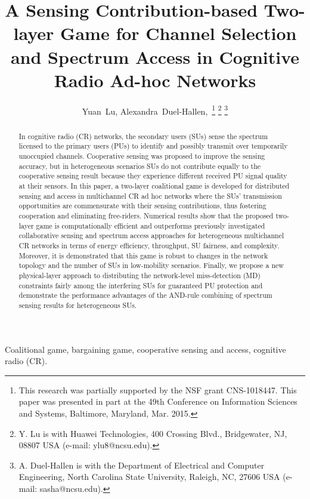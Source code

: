 \documentclass[journal,draftclsnofoot,onecolumn]{IEEEtran}
\theoremstyle{definition}
\begin{document}
\title{A Sensing Contribution-based Two-layer Game for Channel Selection and Spectrum Access in Cognitive Radio Ad-hoc Networks}

\author{Yuan~Lu,
        Alexandra~Duel-Hallen,~\thanks{This research was partially supported by the NSF grant CNS-1018447. This paper was presented in part at the 49th
Conference on Information Sciences and Systems, Baltimore, Maryland, Mar. 2015.}
\thanks{Y. Lu is with Huawei Technologies, 400 Crossing Blvd., Bridgewater, NJ, 08807 USA (e-mail: ylu8@ncsu.edu).}
\thanks{A. Duel-Hallen is with the Department of Electrical and Computer Engineering, North Carolina State University, Raleigh,
NC, 27606 USA  (e-mail: sasha@ncsu.edu).}}
\maketitle


\begin{abstract}
In cognitive radio (CR) networks, the secondary users (SUs) sense the spectrum licensed to the primary users (PUs) to identify and possibly transmit over temporarily unoccupied channels. Cooperative sensing was proposed to improve the sensing accuracy, but in heterogeneous scenarios SUs do not contribute equally to the cooperative sensing result because they experience different received PU signal quality at their sensors. In this paper, a two-layer coalitional game is developed for distributed sensing and access in multichannel CR ad hoc networks where the SUs' transmission opportunities are commensurate with their sensing contributions, thus  fostering cooperation and eliminating free-riders. Numerical results show that the proposed two-layer game is computationally efficient and outperforms previously investigated collaborative sensing and spectrum access approaches for heterogeneous multichannel CR networks in terms of energy efficiency, throughput, SU fairness, and complexity. Moreover, it is demonstrated that this game is robust to changes in the network topology and the number of SUs in low-mobility scenarios. Finally, we propose a new physical-layer approach to distributing the network-level miss-detection (MD) constraints fairly among the interfering SUs for guaranteed PU protection and demonstrate the performance advantages of the AND-rule combining of spectrum sensing results for heterogeneous SUs. 
\end{abstract}

\begin{IEEEkeywords}
Coalitional game, bargaining game, cooperative sensing and access, cognitive radio (CR).
\end{IEEEkeywords}
		
\end{document}
